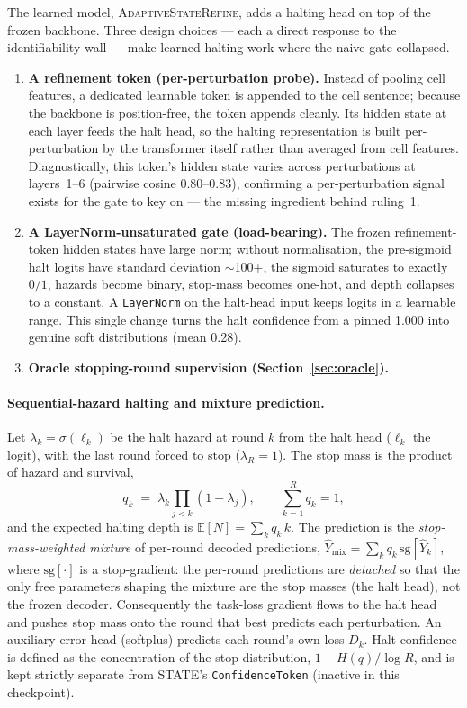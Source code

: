 \documentclass[11pt]{article}
\newcommand{\EN}{\ensuremath{\mathbb{E}[N]}}
\begin{document}
The learned model, \textsc{AdaptiveStateRefine}, adds a halting head on top of the frozen
backbone. Three design choices --- each a direct response to the identifiability wall --- make
learned halting work where the naive gate collapsed.

\begin{enumerate}[leftmargin=1.4em,itemsep=2pt]
\item \textbf{A refinement token (per-perturbation probe).} Instead of pooling cell features, a
dedicated learnable token is appended to the cell sentence; because the backbone is position-free,
the token appends cleanly. Its hidden state at each layer feeds the halt head, so the halting
representation is built per-perturbation by the transformer itself rather than averaged from cell
features. Diagnostically, this token's hidden state varies across perturbations at layers~1--6
(pairwise cosine 0.80--0.83), confirming a per-perturbation signal exists for the gate to key on
--- the missing ingredient behind ruling~1.
\item \textbf{A LayerNorm-unsaturated gate (load-bearing).} The frozen refinement-token hidden
states have large norm; without normalisation, the pre-sigmoid halt logits have standard
deviation $\sim$100+, the sigmoid saturates to exactly $0/1$, hazards become binary, stop-mass
becomes one-hot, and depth collapses to a constant. A \texttt{LayerNorm} on the halt-head input
keeps logits in a learnable range. This single change turns the halt confidence from a pinned
1.000 into genuine soft distributions (mean 0.28).
\item \textbf{Oracle stopping-round supervision (Section~\ref{sec:oracle}).}
\end{enumerate}

\paragraph{Sequential-hazard halting and mixture prediction.} Let $\lambda_k=\sigma(\ell_k)$ be
the halt hazard at round $k$ from the halt head ($\ell_k$ the logit), with the last round forced
to stop ($\lambda_R=1$). The stop mass is the product of hazard and survival,
\begin{equation}
q_k \;=\; \lambda_k \prod_{j<k}(1-\lambda_j), \qquad \sum_{k=1}^{R} q_k = 1,
\end{equation}
and the expected halting depth is $\EN{} = \sum_k q_k\, k$. The prediction is the
\emph{stop-mass-weighted mixture} of per-round decoded predictions,
$\hat{Y}_{\text{mix}} = \sum_k q_k\, \mathrm{sg}[\hat{Y}_k]$, where $\mathrm{sg}[\cdot]$ is a
stop-gradient: the per-round predictions are \emph{detached} so that the only free parameters
shaping the mixture are the stop masses (the halt head), not the frozen decoder. Consequently the
task-loss gradient flows to the halt head and pushes stop mass onto the round that best predicts
each perturbation. An auxiliary error head (softplus) predicts each round's own loss $D_k$. Halt
confidence is defined as the concentration of the stop distribution,
$1 - H(q)/\log R$, and is kept strictly separate from STATE's \texttt{ConfidenceToken} (inactive
in this checkpoint).
\end{document}
